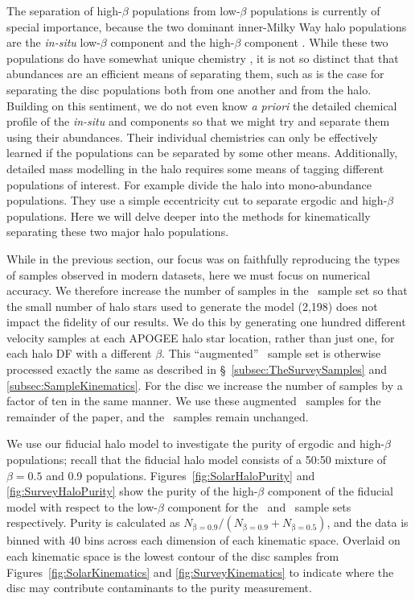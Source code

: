 The separation of high-$\beta$ populations from low-$\beta$ populations is currently of special importance, because the two dominant inner-Milky Way halo populations are the \textit{in-situ} low-$\beta$ component and the high-$\beta$ \gse component \parencite{belokurov18,helmi18,iorio21}. While these two populations do have somewhat unique chemistry \parencite{haywood18}, it is not so distinct that that abundances are an efficient means of separating them, such as is the case for separating the disc populations both from one another and from the halo. Building on this sentiment, we do not even know \textit{a priori} the detailed chemical profile of the \textit{in-situ} and \gse components so that we might try and separate them using their abundances. Their individual chemistries can only be effectively learned if the populations can be separated by some other means. Additionally, detailed mass modelling in the halo requires some means of tagging different populations of interest. For example \textcite{mackereth20} divide the halo into mono-abundance populations. They use a simple eccentricity cut to separate ergodic and high-$\beta$ populations. Here we will delve deeper into the methods for kinematically separating these two major halo populations.

While in the previous section, our focus was on faithfully reproducing the types of samples observed in modern datasets, here we must focus on numerical accuracy. We therefore increase the number of samples in the \survey\ sample set so that the small number of halo stars used to generate the model (2,198) does not impact the fidelity of our results. We do this by generating one hundred different velocity samples at each APOGEE halo star location, rather than just one, for each halo DF with a different $\beta$. This ``augmented'' \survey\ sample set is otherwise processed exactly the same as described in \S~\ref{subsec:TheSurveySamples} and \ref{subsec:SampleKinematics}. For the disc we increase the number of samples by a factor of ten in the same manner. We use these augmented \survey\ samples for the remainder of the paper, and the \solar\ samples remain unchanged.

We use our fiducial halo model to investigate the purity of ergodic and high-$\beta$ populations; recall that the fiducial halo model consists of a 50:50 mixture of $\beta=0.5$ and 0.9 populations. Figures~\ref{fig:SolarHaloPurity} and \ref{fig:SurveyHaloPurity} show the purity of the high-$\beta$ component of the fiducial model with respect to the low-$\beta$ component for the \solar\ and \survey\ sample sets respectively. Purity is calculated as $N_\mathrm{\beta=0.9}/(N_\mathrm{\beta=0.9}+N_\mathrm{\beta=0.5})$, and the data is binned with 40 bins across each dimension of each kinematic space. Overlaid on each kinematic space is the lowest contour of the disc samples from Figures~\ref{fig:SolarKinematics} and \ref{fig:SurveyKinematics} to indicate where the disc may contribute contaminants to the purity measurement.


